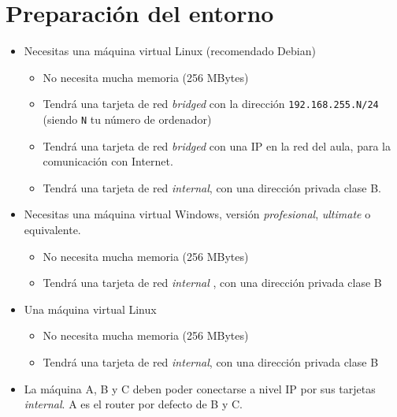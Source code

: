 \section{Preparación del entorno}
\begin{itemize}
\item  Necesitas una máquina virtual Linux (recomendado Debian)
  \begin{itemize}
  \item No necesita mucha memoria (256 MBytes)
    
  \item Tendrá una tarjeta de red \textit{bridged} con la dirección \texttt{192.168.255.N/24} (siendo \texttt{N} tu número de ordenador)
  \item Tendrá una tarjeta de red \textit{bridged} con una IP en la red del aula, para la comunicación con Internet.
  \item Tendrá una tarjeta de red \textit{internal}, con una dirección privada clase B.

  \end{itemize}



\item Necesitas una máquina virtual Windows, versión \textit{profesional}, \textit{ultimate} o equivalente.
  \begin{itemize}
  \item  No necesita mucha memoria (256 MBytes)
  \item Tendrá una tarjeta de red \textit{internal} , con una dirección privada clase B
  \end{itemize}
\item Una máquina virtual Linux
  \begin{itemize}
  \item No necesita mucha memoria (256 MBytes)
  \item Tendrá una tarjeta de red \textit{internal}, con una dirección privada clase B
  \end{itemize}
  
\item  La máquina A, B y C deben poder conectarse a nivel IP por sus tarjetas \textit{internal}. A es el router por defecto de B y C.
\end{itemize}



